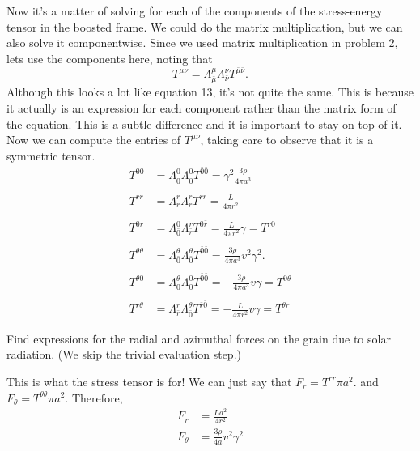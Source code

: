 \documentclass[11pt,largemargins]{homework}
\begin{document}
\begin{alphaparts}
Now it's a matter of solving for each of the components of the stress-energy tensor in the boosted frame.  We could do the matrix multiplication, but we can also solve it componentwise.  Since we used matrix multiplication in problem 2, lets use the components here, noting that 
\begin{equation}
T^{\mu \nu} = \Lambda_{\bar{\mu}}^{\mu} \Lambda_{\bar{\nu}}^{\nu} T^{\bar{\mu} \bar{\nu}}.
\end{equation}  Although this looks a lot like equation 13, it's not quite the same.  This is because it actually is an expression for each component rather than the matrix form of the equation.  This is a subtle difference and it is important to stay on top of it.  Now we can compute the entries of $T^{\mu \nu}$, taking care to observe that it is a symmetric tensor.
\begin{subequations}
\begin{align*}
T^{00} &= \Lambda_{\bar{0}}^{0} \Lambda_{\bar{0}}^{0} T^{\bar{0}\bar{0}} = \gamma^2 \frac{3 \rho}{4 \pi a^3} \\ \\
T^{rr} &= \Lambda_{\bar{r}}^{r} \Lambda_{\bar{r}}^{r} T^{\bar{r}\bar{r}} = \frac{L}{4 \pi r^2} \\ \\
T^{0r} &= \Lambda_{\bar{0}}^{0} \Lambda_{\bar{r}}^{r} T^{\bar{0}\bar{r}} = \frac{L}{4 \pi r^2} \gamma = T^{r0} \\ \\ 
T^{\theta \theta} &= \Lambda_{\bar{0}}^{\theta} \Lambda_{\bar{0}}^{\theta} T^{\bar{0}\bar{0}} = \frac{3 \rho}{4 \pi a^3} v^2 \gamma^2. \\ \\
T^{\theta 0} &= \Lambda_{\bar{0}}^{\theta} \Lambda_{\bar{0}}^{0} T^{\bar{0}\bar{0}} = -\frac{3 \rho}{4 \pi a^3} v \gamma = T^{0 \theta} \\ \\
T^{r \theta} &= \Lambda_{\bar{r}}^{r} \Lambda_{\bar{0}}^{\theta} T^{\bar{r}\bar{0}} = - \frac{L}{4 \pi r^2} v \gamma = T^{\theta r}
\end{align*}
\end{subequations}

\questionpart 
Find expressions for the radial and azimuthal forces on the grain due to solar radiation.  (We skip the trivial evaluation step.) 

This is what the stress tensor is for!  We can just say that $F_{r} = T^{rr} \pi a^2.$ and $F_{\theta} = T^{\theta \theta} \pi a^2$. Therefore,
\begin{subequations}
\begin{align}
F_r &= \frac{L a^2}{4 r^2} \\
F_{\theta} &= \frac{3 \rho}{4 a} v^2 \gamma^2
\end{align}
\end{subequations}
\end{alphaparts}
\end{document}
